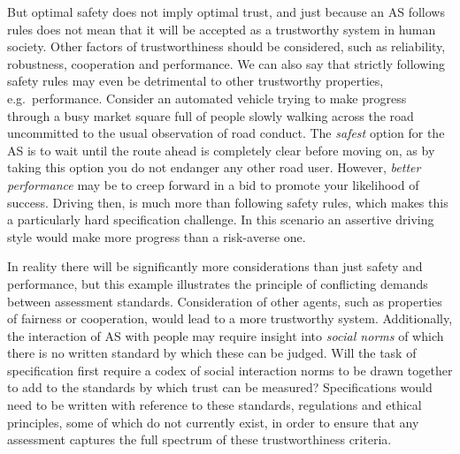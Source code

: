 \documentclass[sigconf,nonacm]{acmart}%
\begin{document}
	But optimal safety does not imply optimal trust, and just because an AS follows rules does not mean that it will be accepted as a trustworthy system in human society. Other factors of trustworthiness should be considered, such as reliability, robustness, cooperation and performance. 
	We can also say that strictly following safety rules may even be detrimental to other trustworthy properties, e.g.\ performance. 
	Consider an automated vehicle trying to make progress through a busy market square full of people slowly walking across the road uncommitted to the usual observation of road conduct. 
	The \emph{safest} option for the AS is to wait until the route ahead is completely clear before moving on, as by taking this option you do not endanger any other road user. However, \emph{better performance} may be to creep forward in a bid to promote your likelihood of success.
	Driving then, is much more than following safety rules, which makes this a particularly hard specification challenge. In this scenario an assertive driving style would make more progress than a risk-averse one. 
	
	
	In reality there will be significantly more considerations than just safety and performance, but this example illustrates the principle of conflicting demands between assessment standards. 
	Consideration of other agents, such as properties of fairness or cooperation, would lead to a more trustworthy system. 
	Additionally, the interaction of AS with people may require insight into \emph{social norms} of which there is no written standard by which these can be judged. Will the task of specification first require a codex of social interaction norms to be drawn together to add to the standards by which trust can be measured? 
	Specifications would need to be written with reference to these standards, regulations and ethical principles, some of which do not currently exist, in order to ensure that any assessment captures the full spectrum of these trustworthiness criteria. 
	
\end{document}

